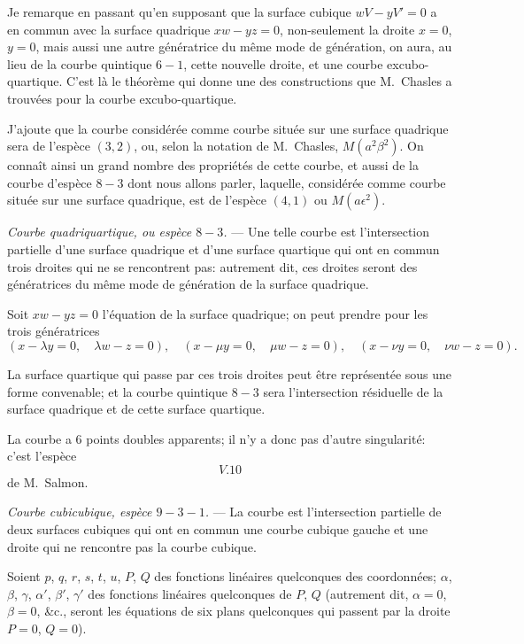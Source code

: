 \documentclass[11pt,a4paper]{article}
\begin{document}
Je remarque en passant qu'en supposant que la surface cubique $wV - yV' = 0$ a en commun avec la surface quadrique $xw - yz = 0$, non-seulement la droite $x = 0$, $y = 0$, mais aussi une autre g\'{e}n\'{e}ratrice du m\^{e}me mode de g\'{e}n\'{e}ration, on aura, au lieu de la courbe quintique $6 - 1$, cette nouvelle droite, et une courbe excubo-quartique. C'est l\`{a} le th\'{e}or\`{e}me qui donne une des constructions que M.~Chasles a trouv\'{e}es pour la courbe excubo-quartique.

J'ajoute que la courbe consid\'{e}r\'{e}e comme courbe situ\'{e}e sur une surface quadrique sera de l'esp\`{e}ce $(3, 2)$, ou, selon la notation de M.~Chasles, $M(a^2\beta^2)$. On conna\^{i}t ainsi un grand nombre des propri\'{e}t\'{e}s de cette courbe, et aussi de la courbe d'esp\`{e}ce $8 - 3$ dont nous allons parler, laquelle, consid\'{e}r\'{e}e comme courbe situ\'{e}e sur une surface quadrique, est de l'esp\`{e}ce $(4, 1)$ ou $M(a\epsilon^2)$.

\medskip
\noindent\textit{Courbe quadriquartique, ou esp\`{e}ce $8 - 3$.} --- Une telle courbe est l'intersection partielle d'une surface quadrique et d'une surface quartique qui ont en commun trois droites qui ne se rencontrent pas: autrement dit, ces droites seront des g\'{e}n\'{e}ratrices du m\^{e}me mode de g\'{e}n\'{e}ration de la surface quadrique.

Soit $xw - yz = 0$ l'\'{e}quation de la surface quadrique; on peut prendre pour les trois g\'{e}n\'{e}ratrices
\[
(x - \lambda y = 0, \quad \lambda w - z = 0), \quad (x - \mu y = 0, \quad \mu w - z = 0), \quad (x - \nu y = 0, \quad \nu w - z = 0).
\]

\clearpage

La surface quartique qui passe par ces trois droites peut \^{e}tre repr\'{e}sent\'{e}e sous une forme convenable; et la courbe quintique $8 - 3$ sera l'intersection r\'{e}siduelle de la surface quadrique et de cette surface quartique.

La courbe a 6 points doubles apparents; il n'y a donc pas d'autre singularit\'{e}: c'est l'esp\`{e}ce
\[
V.10
\]
de M.~Salmon.

\medskip
\noindent\textit{Courbe cubicubique, esp\`{e}ce $9 - 3 - 1$.} --- La courbe est l'intersection partielle de deux surfaces cubiques qui ont en commun une courbe cubique gauche et une droite qui ne rencontre pas la courbe cubique.

Soient $p$, $q$, $r$, $s$, $t$, $u$, $P$, $Q$ des fonctions lin\'{e}aires quelconques des coordonn\'{e}es; $\alpha$, $\beta$, $\gamma$, $\alpha'$, $\beta'$, $\gamma'$ des fonctions lin\'{e}aires quelconques de $P$, $Q$ (autrement dit, $\alpha = 0$, $\beta = 0$, \&c., seront les \'{e}quations de six plans quelconques qui passent par la droite $P = 0$, $Q = 0$).
\end{document}

